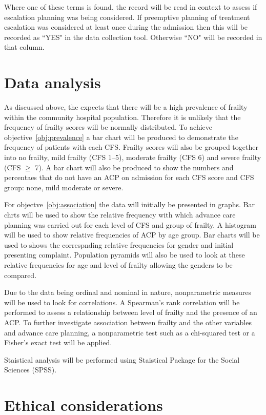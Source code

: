 \documentclass
[
	12pt,
	a4paper,
	oneside,
]{article}
\begin{document}
Where one of these terms is found, the record will be read in context to assess if 
escalation planning was being considered. If preemptive planning of treatment escalation
was considered at least once during the admission then this will be recorded as ``YES"
in the data collection tool. Otherwise ``NO" will be recorded in that column.

\section{Data analysis}
As discussed above, the expects that there will be a high prevalence of frailty 
within the community hospital population. Therefore it is unlikely that the frequency
of frailty scores will be normally distributed. To achieve objective~\ref{obj:prevalence}
a bar chart will be produced to demonstrate the frequency of patients with each CFS.
Frailty scores will also be grouped together into no frailty, mild frailty (CFS 1--5),
moderate frailty (CFS 6) and severe frailty (CFS $\geq$ 7). A bar chart will also 
be produced to show the numbers and percentaes that do not have an ACP on admission
for each CFS score and CFS group: none, mild moderate or severe.

For objectve~\ref{obj:association} the data will initially be presented in graphs.
Bar chrts will be used to show the relative frequency with which advance care planning
was carried out for each level of CFS and group of frailty. A histogram will be 
used to show relative frequencies of ACP by age group. Bar charts 
will be used to shows the correspnding relative frequencies for gender and initial
presenting complaint. Population pyramids will also be used to look at these relative
frequencies for age and level of frailty allowing the genders to be compared.

Due to the data being ordinal and nominal in nature, nonparametric measures will
be used to look for correlations. A Spearman's rank correlation will be performed
to assess a relationship between level of frailty and the presence of an ACP. To 
further investigate association between frailty and the other variables and advance
care planning, a nonparametric test such as a chi-squared test or a Fisher's exact
test will be applied.

Staistical analysis will be performed using Staistical Package for the Social 
Sciences (SPSS).

\section{Ethical considerations}
\end{document}
